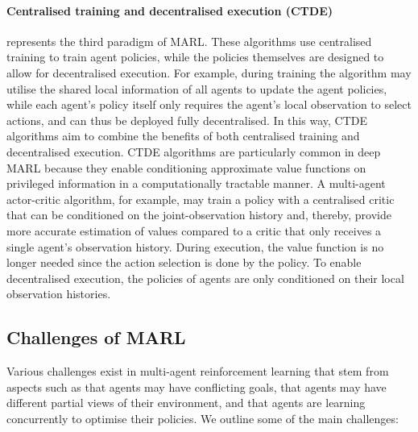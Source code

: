 \documentclass{article}
\begin{document}
\paragraph{Centralised training and decentralised execution (CTDE)} represents the third paradigm of MARL. These algorithms use centralised training to train agent policies, while the policies themselves are designed to allow for decentralised execution. For example, during training the algorithm may utilise the shared local information of all agents to update the agent policies, while each agent’s policy itself only requires the agent’s local observation to select actions, and can thus be deployed fully decentralised. In this way, CTDE algorithms aim to combine the benefits of both centralised training and decentralised execution. CTDE algorithms are particularly common in deep MARL because they enable conditioning approximate value functions on privileged information in a computationally tractable manner. A multi-agent actor-critic algorithm, for example, may train a policy with a centralised critic that can be conditioned on the joint-observation history and, thereby, provide more accurate estimation of values compared to a critic that only receives a single agent’s observation history. During execution, the value function is no longer needed since the action selection is done by the policy. To enable decentralised execution, the policies of agents are only conditioned on their local observation histories.

\subsection{Challenges of MARL}


Various challenges exist in multi-agent reinforcement learning that stem from aspects such as that agents may have conflicting goals, that agents may have different partial views of their environment, and that agents are learning concurrently to optimise their policies. We outline some of the main challenges:  
\end{document}
